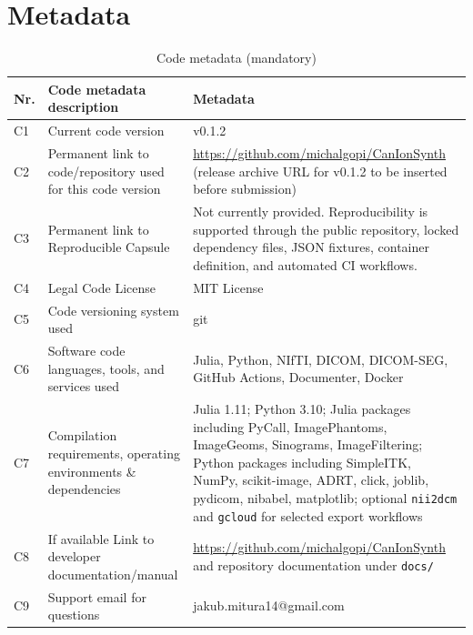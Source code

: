 \documentclass[preprint,12pt, a4paper]{elsarticle}
\begin{document}

\section*{Metadata}

\begin{table}[!h]
\begin{tabular}{|l|p{6.5cm}|p{6.5cm}|}
\hline
\textbf{Nr.} & \textbf{Code metadata description} & \textbf{Metadata} \\
\hline
C1 & Current code version & v0.1.2 \\
\hline
C2 & Permanent link to code/repository used for this code version & \url{https://github.com/michalgopi/CanIonSynth} (release archive URL for v0.1.2 to be inserted before submission) \\
\hline
C3  & Permanent link to Reproducible Capsule & Not currently provided. Reproducibility is supported through the public repository, locked dependency files, JSON fixtures, container definition, and automated CI workflows. \\
\hline
C4 & Legal Code License & MIT License \\
\hline
C5 & Code versioning system used & git \\
\hline
C6 & Software code languages, tools, and services used & Julia, Python, NIfTI, DICOM, DICOM-SEG, GitHub Actions, Documenter, Docker \\
\hline
C7 & Compilation requirements, operating environments \& dependencies & Julia 1.11; Python 3.10; Julia packages including PyCall, ImagePhantoms, ImageGeoms, Sinograms, ImageFiltering; Python packages including SimpleITK, NumPy, scikit-image, ADRT, click, joblib, pydicom, nibabel, matplotlib; optional \texttt{nii2dcm} and \texttt{gcloud} for selected export workflows \\
\hline
C8 & If available Link to developer documentation/manual & \url{https://github.com/michalgopi/CanIonSynth} and repository documentation under \texttt{docs/} \\
\hline
C9 & Support email for questions & jakub.mitura14@gmail.com \\
\hline
\end{tabular}
\caption{Code metadata (mandatory)}
\label{codeMetadata}
\end{table}
\end{document}
